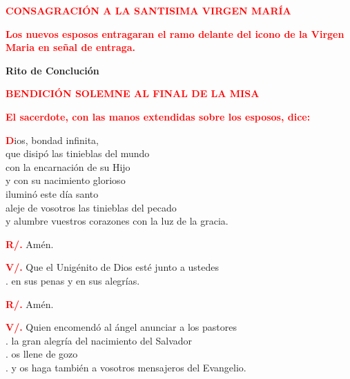 \documentclass[12pt, letterpaper]{report}
\begin{document}
  \Large {\bfseries \textcolor{red}{CONSAGRACI\'ON A LA SANTISIMA VIRGEN MAR\'IA}}

  \large{\bfseries \textcolor{red}{Los nuevos esposos entragaran el ramo delante del icono de la Virgen Maria en se\~nal de entraga.}}

  \clearpage

  \begin{center}
    \Huge {\bfseries Rito de Concluci\'on}
  \end{center}

  \Large {\bfseries \textcolor{red}{BENDICI\'ON SOLEMNE AL FINAL DE LA MISA}}

  \large{\bfseries \textcolor{red}{El sacerdote, con las manos extendidas sobre los esposos, dice:}}
  
  \lettrine[lines=2]{\bfseries \textcolor{red}{D}}{}\Large ios, bondad infinita, \\
  que disip\'o las tinieblas del mundo \\
  con la encarnaci\'on de su Hijo \\
  y con su nacimiento glorioso \\
  ilumin\'o este d\'ia santo \\
  aleje de vosotros las tinieblas del pecado \\
  y alumbre vuestros corazones con la luz de la gracia.

  \Large \hspace{-0.9cm} {\bfseries \textcolor{red}{R/.}} \hspace{0.5cm} Am\'en.

  \Large \hspace{-0.9cm} {\bfseries \textcolor{red}{V/.}} \hspace{0.5cm} Que el Unig\'enito de Dios est\'e junto a ustedes \\
  . \hspace{1cm} en sus penas y en sus alegr\'ias.

  \Large \hspace{-0.9cm} {\bfseries \textcolor{red}{R/.}} \hspace{0.5cm} Am\'en.

  \Large \hspace{-0.9cm} {\bfseries \textcolor{red}{V/.}} \hspace{0.5cm} Quien encomend\'o al \'angel anunciar a los pastores \\
  . \hspace{1cm} la gran alegr\'ia del nacimiento del Salvador \\
  . \hspace{1cm} os llene de gozo \\
  . \hspace{1cm} y os haga tambi\'en a vosotros mensajeros del Evangelio.
\end{document}

